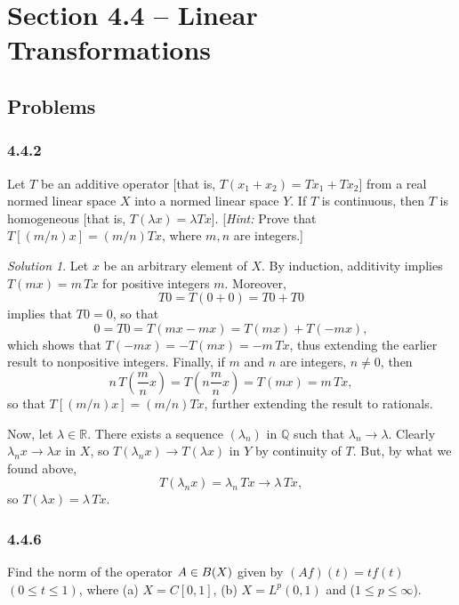 \documentclass{report}
\newcommand{\bb}[1]{\mathbb{#1}}
\let\sc\relax
\newcommand{\sc}[1]{\mathscr{#1}}
\theoremstyle{remark}
\newtheorem*{solution}{Solution}
\begin{document}
\section*{Section 4.4 -- Linear Transformations}

\subsection*{Problems}

\subsubsection*{4.4.2}
Let $T$ be an additive operator [that is, $T(x_1 + x_2) = Tx_1 + Tx_2$] from a real normed linear space $X$ into a normed linear space $Y$. If $T$ is continuous, then $T$ is homogeneous [that is, $T(\lambda x) = \lambda Tx$]. [\emph{Hint:} Prove that $T[(m/n)x] = (m/n)Tx$, where $m,n$ are integers.]

\begin{solution}
  Let $x$ be an arbitrary element of $X$. By induction, additivity implies $T(mx) = m \, Tx$ for positive integers $m$. Moreover,
  \begin{equation*}
    T0 = T(0 + 0) = T0 + T0
  \end{equation*}
  implies that $T0 = 0$, so that
  \begin{equation*}
    0 = T0 = T(mx - mx) = T(mx) + T(-mx),
  \end{equation*}
  which shows that $T(-mx) = -T(mx) = -m \, Tx$, thus extending the earlier result to nonpositive integers. Finally, if $m$ and $n$ are integers, $n \ne 0$, then
  \begin{equation*}
    n \, T \left( \frac{m}{n} x \right) = T \left( n \frac{m}{n} x \right) = T(m x) = m \, Tx,
  \end{equation*}
  so that $T[(m/n)x] = (m/n) Tx$, further extending the result to rationals.

  Now, let $\lambda \in \bb R$. There exists a sequence $(\lambda_n)$ in $\bb Q$ such that $\lambda_n \to \lambda$. Clearly $\lambda_n x \to \lambda x$ in $X$, so $T(\lambda_n x) \to T(\lambda x)$ in $Y$ by continuity of $T$. But, by what we found above,
  \begin{equation*}
    T(\lambda_n x) = \lambda_n \, Tx \to \lambda \, Tx,
  \end{equation*}
  so $T(\lambda x) = \lambda \, Tx$.
\end{solution}

\subsubsection*{4.4.6}
Find the norm of the operator $A \in \sc B(X)$ given by $(Af)(t) = tf(t)$ $(0 \le t \le 1)$, where (a) $X = C[0,1]$, (b) $X = L^p(0,1)$ and ($1 \le p \le \infty$).
\end{document}
